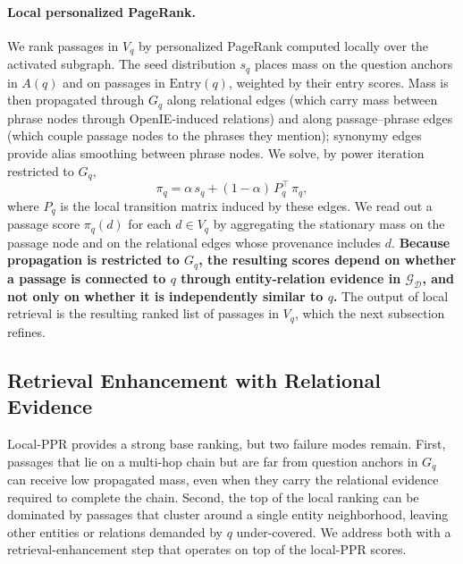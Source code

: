\paragraph{Local personalized PageRank.}
We rank passages in $V_q$ by personalized PageRank computed locally over
the activated subgraph. The seed distribution $s_q$ places mass on the
question anchors in $A(q)$ and on passages in $\mathrm{Entry}(q)$,
weighted by their entry scores. Mass is then propagated through $G_q$
along relational edges (which carry mass between phrase nodes through
OpenIE-induced relations) and along passage--phrase edges (which couple
passage nodes to the phrases they mention); synonymy edges provide alias
smoothing between phrase nodes. We solve, by power iteration restricted
to $G_q$,
\begin{equation}
\label{eq:local-ppr}
\pi_q = \alpha\, s_q + (1-\alpha)\, P_q^{\!\top}\, \pi_q,
\end{equation}
where $P_q$ is the local transition matrix induced by these edges. We
read out a passage score $\pi_q(d)$ for each $d \in V_q$ by aggregating
the stationary mass on the passage node and on the relational edges whose
provenance includes $d$. \textbf{Because propagation is restricted to
$G_q$, the resulting scores depend on whether a passage is connected to
$q$ through entity-relation evidence in $\mathcal{G}_{\mathcal{D}}$, and
not only on whether it is independently similar to $q$.} The output of
local retrieval is the resulting ranked list of passages in $V_q$, which
the next subsection refines.

\subsection{Retrieval Enhancement with Relational Evidence}
\label{sec:method:enhancement}

Local-PPR provides a strong base ranking, but two failure modes remain.
First, passages that lie on a multi-hop chain but are far from question
anchors in $G_q$ can receive low propagated mass, even when they carry the
relational evidence required to complete the chain. Second, the top of the
local ranking can be dominated by passages that cluster around a single
entity neighborhood, leaving other entities or relations demanded by $q$
under-covered. We address both with a retrieval-enhancement step that
operates on top of the local-PPR scores.

